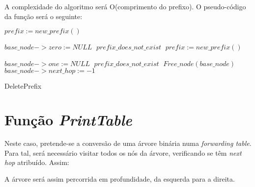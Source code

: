 \documentclass[twocolumn]{article}
\begin{document}
A complexidade do algoritmo será O(comprimento do prefixo). %
O pseudo-código da função será o seguinte:
\begin{algorithmic}
 	\;
 \EndIf
 		\State $prefix:=new\_prefix()\;$
 		
 				\State $base\_node->zero:=NULL\;$
 			\EndIf
 		\Else
 			\State $prefix\_does\_not\_exist\;$
 			\;
 		\EndIf
 	\Else
 			\State $prefix:=new\_prefix()\;$
 		
 					\State $base\_node->one:=NULL\;$
 				\EndIf
 			\Else
 				\State $prefix\_does\_not\_exist\;$
 				\;
 			\EndIf
 		\EndIf
 	\EndIf
 \Else
 		\State $Free\_node(base\_node)\;$
 		\;
 	\Else
		\State $base\_node->next\_hop:=-1\;$	
 	\EndIf
 \EndIf
 \;
 \caption{DeletePrefix}
\end{algorithmic}
\section{Função \textit{PrintTable}}
Neste caso, pretende-se a conversão de uma árvore binária numa \textit{forwarding table}. Para tal, será necessário visitar todos os nós da árvore, verificando se têm \textit{next hop} atribuído. Assim:

\begin{algorithmic}
 \If{$has\_next\_hop$}{
	\State $print\_node\_prefix\_and\_next\_hop\;$
 \EndIf
 \If{$has\_"0"\_child$}
	\State $PrintTable(zero\_child)\;$
 \EndIf
 \If{$has\_"1"\_child$}
	\State $PrintTable(one\_child)\;$
 \EndIf
 
 \Return\;
 \caption{PrintTable}
\end{algorithmic}
A árvore será assim percorrida em profundidade, da esquerda para a direita.
\end{document}
